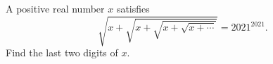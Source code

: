 A positive real number $x$ satisfies
\[\sqrt{x+\sqrt{x+\sqrt{x+\sqrt{x+\cdots}}}}=2021^{2021}.\]
Find the last two digits of $x$.
